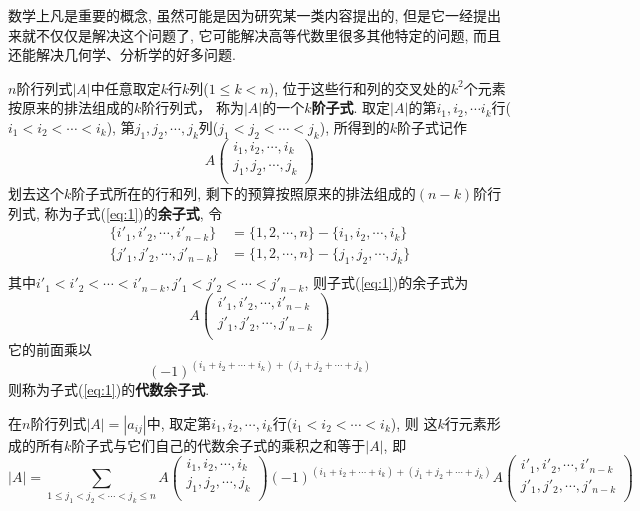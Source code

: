 \begin{Note}
数学上凡是重要的概念, 虽然可能是因为研究某一类内容提出的, 但是它一经提出来就不仅仅是解决这个问题了, 它可能解决高等代数里很多其他特定的问题, 而且还能解决几何学、分析学的好多问题.
\end{Note}

\begin{Definition}
$n$阶行列式$|A|$中任意取定$k$行$k$列($1 \le k < n$), 位于这些行和列的交叉处的$k^2$个元素按原来的排法组成的$k$阶行列式，
称为$|A|$的一个\textbf{$k$阶子式}. 取定$|A|$的第$i_1, i_2, \cdots i_k$行($i_1 < i_2 < \cdots < i_k$), 第$j_1, j_2, \cdots, j_k$列($j_1 < j_2 < \cdots < j_k$), 所得到的$k$阶子式记作
\begin{equation} \label{eq:1}
A \begin{pmatrix}
i_1, i_2, \cdots, i_k \\
j_1, j_2, \cdots, j_k \\
\end{pmatrix}
\end{equation}
划去这个$k$阶子式所在的行和列, 剩下的预算按照原来的排法组成的$(n-k)$阶行列式, 称为子式(\ref{eq:1})的\textbf{余子式},
令
$$
\begin{aligned}
\{ i'_1, i'_2, \cdots, i'_{n-k} \} &= \{ 1, 2, \cdots, n \} - \{ i_1, i_2, \cdots, i_k \} \\
\{ j'_1, j'_2, \cdots, j'_{n-k} \} &= \{ 1, 2, \cdots, n \} - \{ j_1, j_2, \cdots, j_k \} \\
\end{aligned}
$$
其中$i'_1 < i'_2 < \cdots < i'_{n-k}, j'_1 < j'_2 < \cdots < j'_{n-k}$, 则子式(\ref{eq:1})的余子式为
$$
A \begin{pmatrix}
i'_1, i'_2, \cdots, i'_{n-k} \\
j'_1, j'_2, \cdots, j'_{n-k} \\
\end{pmatrix}
$$
它的前面乘以 
$${(-1)}^{(i_1 + i_2 + \cdots + i_k ) + (j_1 +j_2 + \cdots + j_k)}$$
则称为子式(\ref{eq:1})的\textbf{代数余子式}.
\end{Definition}

\begin{Theorem}[Laplace定理]
在$n$阶行列式$|A| = |a_{ij}|$中, 取定第$i_1, i_2, \cdots, i_k$行($i_1 < i_2 < \cdots < i_k$), 则
这$k$行元素形成的所有$k$阶子式与它们自己的代数余子式的乘积之和等于$|A|$, 即
$$
|A| = \sum_{1 \le j_1 < j_2 < \cdots < j_k \le n} A\begin{pmatrix}
i_1, i_2, \cdots, i_k \\
j_1, j_2, \cdots, j_k \\
\end{pmatrix} (-1)^{(i_1 + i_2 + \cdots + i_k) + (j_1 + j_2 + \cdots + j_k)} A \begin{pmatrix}
i'_1, i'_2, \cdots, i'_{n-k} \\
j'_1, j'_2, \cdots, j'_{n-k} \\
\end{pmatrix}
$$
\end{Theorem}

